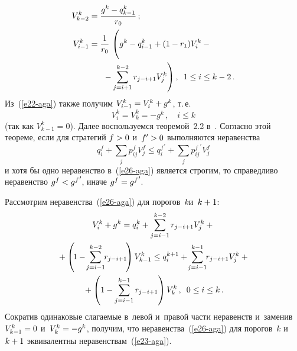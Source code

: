 \begin{multicols}{2}
 \begin{figure*}[b] %
       \vspace*{1pt}
 \begin{center}
 \mbox{%
 \epsfxsize=163.657mm
 }
 \end{center}
 \vspace*{-9pt}
      \end{figure*}


\noindent
\begin{align*}
V^k_{k-2} & = \fr{g^k-q^k_{k-1}}{r_0}\,;\\
V^k_{i-1} &= \fr{1}{r_0}\,
\left( \vphantom{\sum\limits_{j=i+1}^{k-2}}
g^k-q^k_{i-1} +(1-r_1)V_i^k -{}\right.\\
&\hspace*{5mm}\left.{}-\sum\limits_{j=i+1}^{k-2} r_{j-
i+1}V_j^k\right),\enskip 1\leq i\leq k-2\,.
\end{align*}
Из~(\ref{e22-aga}) также получим $V^k_{i-1}\hm= V_i^k\hm+ g^k$,  т.\,е.
\begin{equation}
V_i^k= V_k^k= -g^k\,,\quad i\leq k 
\label{e25-aga}
\end{equation}
(так как $V^k_{k-1}=0$).
Далее воспользуемся теоремой~2.2 в~\cite{10-aga}. Согласно этой теореме,
если для стратегий $f\hm>0$ и~$f^\prime\hm>0$ выполняются неравенства
\begin{equation}
q_i^f +\sum\limits_j p^f_{ij} V_j^f \leq {q_i^{f}}^{\prime} + \sum\limits_j
{p_{ij}^{f}}^{\prime} V_j^f
\label{e26-aga}
\end{equation}
и хотя бы одно неравенство в~(\ref{e26-aga}) является строгим, то справедливо
неравенство $g^f\hm<{g^{f}}^{\prime}$, иначе $g^f\hm= {g^{f}}^{\prime}$.

  Рассмотрим неравенства~(\ref{e26-aga}) для порогов~$k$\linebreak и~$k\hm+1$:
  \begin{multline*}
  V_i^k +g^k =q_i^k +\sum\limits_{j=i-1}^{k-2} r_{j-i+1} V_j^k+{}\\
  {}+\left(\! 1- \hspace*{-0.5mm}
\sum\limits_{j=i-1}^{k-2}\hspace*{-1mm} r_{j-i+1}\!\right) V^k_{k-1}\leq q_i^{k+1} +\hspace*{-0.5mm}
\sum\limits_{j=i-1}^{k-1}\hspace*{-1mm} r_{j-i+1} V_j^k +{}\\
{}+\left( 1-
\sum\limits_{j=i-1}^{k-1} r_{j-i+1}\right) V_k^k\,,\enskip 0\leq i\leq k\,.
  \end{multline*}
Сократив одинаковые слагаемые в~левой и~правой части неравенств и~заменив
$V^k_{k-1}\hm=0$ и~$V_k^k\hm= -g^k$,  получим, что
неравенства~(\ref{e26-aga}) для порогов~$k$ и~$k\hm+1$ эквивалентны
неравенствам~(\ref{e23-aga}).


\end{multicols}
